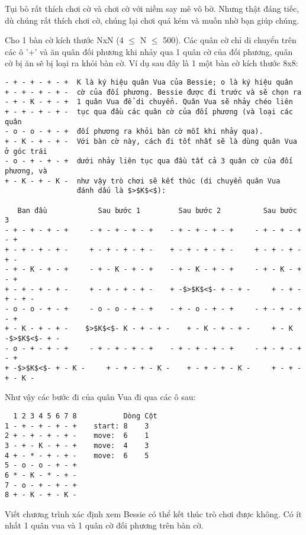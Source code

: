 



   Tụi bò rất thích chơi cờ và chơi cờ với niềm say mê vô bờ. Nhưng thật đáng tiếc, dù chúng rất thích chơi cờ, chúng lại chơi  quá kém và muốn nhờ bạn giúp chúng.  

   Cho 1 bàn cờ kích thước NxN (4  $\le$  N  $\le$  500).  Các quân cờ chỉ di chuyển trên các ô '+' và ăn quân đối phương khi nhảy qua 1 quân cờ của đối phương, quân cờ bị ăn sẽ bị loại ra khỏi bàn cờ. Ví dụ sau đây là 1 một bàn cờ kích thước 8x8:  
\begin{verbatim}
- + - + - + - +  K là ký hiệu quân Vua của Bessie; o là ký hiệu quân
+ - + - + - + -  cờ của đối phương. Bessie được đi trước và sẽ chọn ra 
- + - K - + - +  1 quân Vua để di chuyển. Quân Vua sẽ nhảy chéo liên 
+ - + - + - + -  tục qua đầu các quân cờ của đối phương (và loại các quân 
- o - o - + - +  đối phương ra khỏi bàn cờ mỗi khi nhảy qua).
+ - K - + - + -  Với bàn cờ này, cách đi tốt nhất sẽ là dùng quân Vua ở góc trái 
- o - + - + - +  dưới nhảy liên tục qua đầu tất cả 3 quân cờ của đối phương, và 
+ - K - + - K -  như vậy trò chơi sẽ kết thúc (di chuyển quân Vua
                 đánh dấu là $>$K$<$):

   Ban đầu            Sau bước 1         Sau bước 2          Sau bước 3
- + - + - + - +     - + - + - + - +    - + - + - + - +     - + - + - + - +
+ - + - + - + -     + - + - + - + -    + - + - + - + -     + - + - + - + -
- + - K - + - +     - + - K - + - +    - + - K - + - +     - + - K - + - +
+ - + - + - + -     + - + - + - + -    + -$>$K$<$- + - + -     + - + - + - + -
- o - o - + - +     - o - o - + - +    - + - o - + - +     - + - + - + - +
+ - K - + - + -    $>$K$<$- K - + - + -    + - K - + - + -     + - K -$>$K$<$- + -
- o - + - + - +     - + - + - + - +    - + - + - + - +     - + - + - + - +
+ -$>$K$<$- + - K -     + - + - + - K -    + - + - + - K -     + - + - + - K -
\end{verbatim}

   Như vậy các bước đi của quân Vua đi qua các ô sau:  
\begin{verbatim}
  1 2 3 4 5 6 7 8           Dòng Cột
1 - + - + - + - +    start: 8    3
2 + - + - + - + -    move:  6    1
3 - + - K - + - +    move:  4    3
4 + - * - + - + -    move:  6    5
5 - o - o - + - +
6 * - K - * - + - 
7 - o - + - + - + 
8 + - K - + - K - 
\end{verbatim}

   Viết chương trình xác định xem Bessie có thể kết thúc trò chơi được không. Có ít nhất 1 quân vua và 1 quân cờ đối phương trên bàn cờ.  

